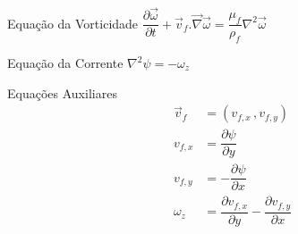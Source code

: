 \documentclass{beamer}
\newcommand{\partfrac}[3] %
{
  \ensuremath{\dfrac{\partial{#2}}{\partial{#3}}}
}
\begin{document}
\begin{frame}
  \frametitle{\subsecname}
  
  \begin{minipage}{.53\textwidth}
    \begin{block}{Equação da Vorticidade}
      \centering
      $\dfrac{\partial \vec{\omega}}{\partial t} + \vec{v}_f.\vec{\nabla}\vec{\omega} = \dfrac{\mu_f}{\rho_f} \nabla^2 \vec{\omega}$
    \end{block}
    
    \begin{block}{Equação da Corrente}
      \centering
      $\nabla^2\psi = -\omega_z$
    \end{block}
  \end{minipage}
  \hfill
  \begin{minipage}{.41\textwidth}
    \begin{block}{Equações Auxiliares}
      \vspace*{-\baselineskip}\setlength\belowdisplayshortskip{0pt} %
      \centering
      \begin{align*}
	\vec{v}_f &= \left(v_{f,x}\, , v_{f,y} \right)\\
	v_{f,x} &= \partfrac2{\psi}{y} \\
	v_{f,y} &= -\partfrac2{\psi}{x} \\
	\omega_z &= \partfrac2{v_{f,x}}{y} - \partfrac2{v_{f,y}}{x} 
      \end{align*}
    \end{block}
  \end{minipage}
\end{frame}

\end{document}
